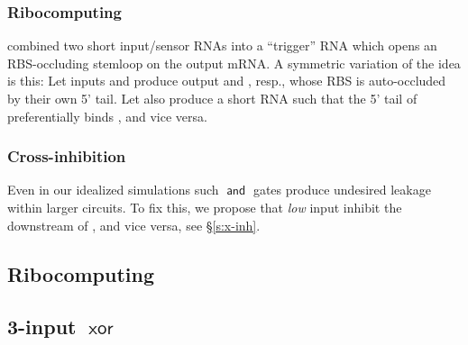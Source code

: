 \documentclass[12pt,notitlepage]{article}
\newcommand{\AND}{\ensuremath{\mathop{\mathsf{and}}}\xspace}
\newcommand{\XOR}{\ensuremath{\mathop{\mathsf{xor}}}\xspace}
\newcommand{\ra}[1]{{\color{Blue}#1}}
\begin{document}
\subsubsection*{Ribocomputing}

\cite[\href{https://www.nature.com/articles/nature23271/figures/2}{Fig.~2e}]{GreenETAL2017}
combined
two short input/sensor RNAs
into a ``trigger'' RNA
which opens an RBS-occluding stemloop
on the output mRNA.
%
%
A symmetric variation of the idea is this:
%
Let inputs  and  
produce
output  and , resp.,
whose RBS is auto-occluded
by their own 5' tail.
%
Let  
also produce a short RNA
such that
the 5' tail of  preferentially binds ,
and vice versa.

\subsubsection*{Cross-inhibition}

Even in our idealized simulations
such \AND gates produce undesired leakage
within larger circuits.
%
%
%
To fix this, we propose that
\emph{low} input  
{inhibit} the downstream of ,
and vice versa,
see \S\ref{s:x-inh}.




\subsection{Ribocomputing}

\ra{}


\subsection{3-input \XOR}
\end{document}
